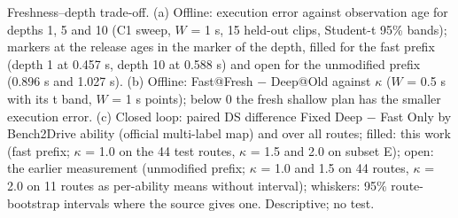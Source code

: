 \caption{Freshness--depth trade-off. (a) Offline: execution error against observation age for depths 1, 5 and 10 (C1 sweep, $W$ = 1 s, 15 held-out clips, Student-t 95\% bands); markers at the release ages in the marker of the depth, filled for the fast prefix (depth 1 at 0.457 s, depth 10 at 0.588 s) and open for the unmodified prefix (0.896 s and 1.027 s). (b) Offline: Fast@Fresh $-$ Deep@Old against $\kappa$ ($W$ = 0.5 s with its t band, $W$ = 1 s points); below 0 the fresh shallow plan has the smaller execution error. (c) Closed loop: paired DS difference Fixed Deep $-$ Fast Only by Bench2Drive ability (official multi-label map) and over all routes; filled: this work (fast prefix; $\kappa$ = 1.0 on the 44 test routes, $\kappa$ = 1.5 and 2.0 on subset E); open: the earlier measurement (unmodified prefix; $\kappa$ = 1.0 and 1.5 on 44 routes, $\kappa$ = 2.0 on 11 routes as per-ability means without interval); whiskers: 95\% route-bootstrap intervals where the source gives one. Descriptive; no test.}%
\label{fig:fig1}%
